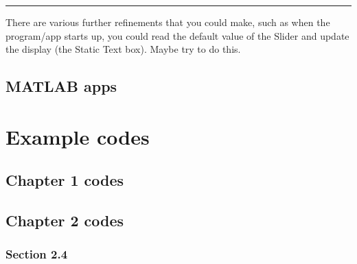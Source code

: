 \documentclass{tufte-book} %
\begin{document}
\vspace{1mm}
\noindent\rule{4cm}{0.5pt}
\vspace{2mm}

\noindent There are various further refinements that you could make, such as when the program/app starts up, you could read the default value of the \textsf{Slider} and update the display (the \textsf{Static Text} box). Maybe try to do this.


\newpage


\section{\textbf{MATLAB} apps}




\chapter{Example codes}
\label{ch:11}


\newpage


\section{Chapter 1 codes}


\newpage


\section{Chapter 2 codes}


\subsection*{\textbf{Section 2.4}}
\end{document}
